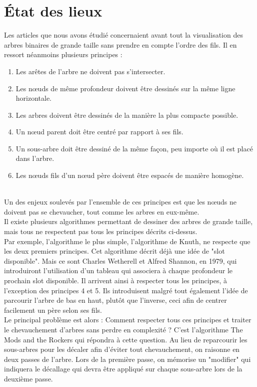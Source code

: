 \chapter{État des lieux}

Les articles que nous avons étudié concernaient avant tout la visualisation des arbres binaires de grande taille sans prendre en compte l'ordre des fils. Il en ressort néanmoins plusieurs principes :
\begin{enumerate}
	\item Les ar\^etes de l'arbre ne doivent pas s'intersecter.
	\item Les n\oe{}uds de m\^eme profondeur doivent \^etre dessinés sur la m\^eme ligne horizontale.
	\item Les arbres doivent \^etre dessinés de la manière la plus compacte possible.
	\item Un n\oe{}ud parent doit \^etre centré par rapport à ses fils.
	\item Un sous-arbre doit \^etre dessiné de la même façon, peu importe où il est placé dans l'arbre.
	\item Les n\oe{}uds fils d'un n\oe{}ud père doivent être espacés de manière homogène.
\end{enumerate}
~\\
Un des enjeux soulevés par l'ensemble de ces principes est que les n\oe{}uds ne doivent pas se chevaucher, tout comme les arbres en eux-m\^eme.
~\\
Il existe plusieurs algorithmes permettant de dessiner des arbres de grande taille, mais tous ne respectent pas tous les principes décrits ci-dessus. \\
Par exemple, l'algorithme le plus simple, l'algorithme de Knuth, ne respecte que les deux premiers principes. Cet algorithme décrit déjà une idée de "slot disponible". Mais ce sont Charles Wetherell et Alfred Shannon, en 1979, qui introduiront l'utilisation d'un tableau qui associera à chaque profondeur le prochain slot disponible. Il arrivent ainsi à respecter tous les principes, à l'exception des principes 4 et 5. Ils introduisent malgré tout également l'idée de parcourir l'arbre de bas en haut, plut\^ot que l'inverse, ceci afin de centrer facilement un père selon ses fils. \\
Le principal problème est alors : Comment respecter tous ces principes et traiter le chevauchement d'arbres sans perdre en complexité ? C'est l'algorithme The Mods and the Rockers qui répondra à cette question. Au lieu de reparcourir les sous-arbres pour les décaler afin d'éviter tout chevauchement, on raisonne en deux passes de l'arbre. Lors de la première passe, on mémorise un "modifier" qui indiquera le décallage qui devra \^etre appliqué sur chaque sous-arbre lors de la deuxième passe. \\
